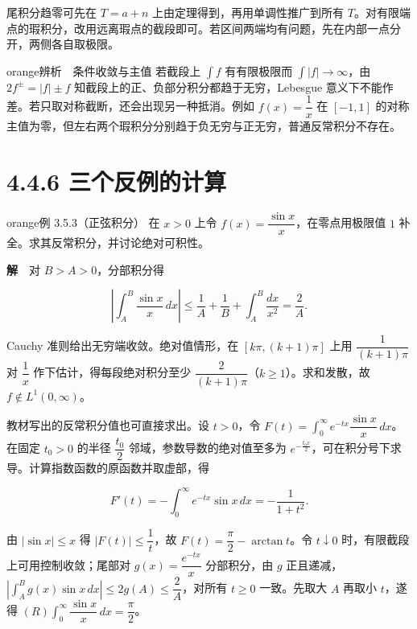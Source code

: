 \documentclass[11pt,a4paper]{article}
\begin{document}
尾积分趋零可先在 \(T=a+n\) 上由定理得到，再用单调性推广到所有
\(T\)。对有限端点的瑕积分，改用远离瑕点的截段即可。若区间两端均有问题，先在内部一点分开，两侧各自取极限。

\begin{sboxenv}{orange}{辨析　条件收敛与主值}
若截段上 \(\int f\) 有有限极限而 \(\int|f|\to\infty\)，由
\(2f^\pm=|f|\pm f\) 知截段上的正、负部分积分都趋于无穷，Lebesgue
意义下不能作差。若只取对称截断，还会出现另一种抵消。例如
\(f(x)=\dfrac1x\) 在 \([-1,1]\)
的对称主值为零，但左右两个瑕积分分别趋于负无穷与正无穷，普通反常积分不存在。

\end{sboxenv}

\section[\S{}4.4.6
三个反例的计算]{4.4.6
三个反例的计算}\label{ux4e09ux4e2aux53cdux4f8bux7684ux8ba1ux7b97}

\begin{sboxenv}{orange}{例 3.5.3（正弦积分）}
在 \(x>0\) 上令 \(f(x)=\dfrac{\sin x}{x}\)，在零点用极限值 \(1\)
补全。求其反常积分，并讨论绝对可积性。

\end{sboxenv}

\textbf{解}　对 \(B>A>0\)，分部积分得

\begin{equation*}
\left|\int_A^B\frac{\sin x}{x}\,dx\right|
\le \frac1A+\frac1B+\int_A^B\frac{dx}{x^2}=\frac2A .
\end{equation*}

Cauchy 准则给出无穷端收敛。绝对值情形，在 \([k\pi,(k+1)\pi]\) 上用
\(\dfrac1{(k+1)\pi}\) 对 \(\dfrac1x\) 作下估计，得每段绝对积分至少
\(\dfrac2{(k+1)\pi}\)（\(k\ge1\)）。求和发散，故
\(f\notin L^1(0,\infty)\)。

教材写出的反常积分值也可直接求出。设 \(t>0\)，令
\(F(t)=\int_0^\infty e^{-tx}\dfrac{\sin x}{x}\,dx\)。在固定 \(t_0>0\)
的半径 \(\dfrac{t_0}{2}\) 邻域，参数导数的绝对值至多为
\(e^{-\frac{t_0x}{2}}\)，可在积分号下求导。计算指数函数的原函数并取虚部，得

\begin{equation*}
F'(t)=-\int_0^\infty e^{-tx}\sin x\,dx=-\frac1{1+t^2}.
\end{equation*}

由 \(|\sin x|\le x\) 得 \(|F(t)|\le\dfrac1t\)，故
\(F(t)=\dfrac{\pi}{2}-\arctan t\)。令 \(t\downarrow0\)
时，有限截段上可用控制收敛；尾部对 \(g(x)=\dfrac{e^{-tx}}x\)
分部积分，由 \(g\)
正且递减，\(\left|\int_A^B g(x)\sin x\,dx\right|\le 2g(A)\le\dfrac2A\)，对所有
\(t\ge0\) 一致。先取大 \(A\) 再取小 \(t\)，遂得
\((R)\int_0^\infty\dfrac{\sin x}{x}\,dx=\dfrac{\pi}{2}\)。
\end{document}
